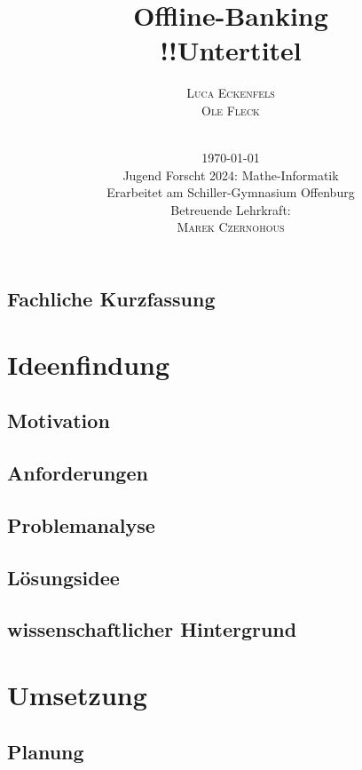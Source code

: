 \documentclass[a4paper,12pt,ngerman]{scrreport}
\title{Offline-Banking\\
    \vspace{6mm}
    \large{!!Untertitel}}
\author{\Large{\textsc{Luca Eckenfels}}\\\textsc{Ole Fleck}\\
    \vspace{5cm}\\
\date{\today\\\vspace{12mm}
Jugend Forscht 2024: Mathe-Informatik\\\vspace{6mm}
    Erarbeitet am Schiller-Gymnasium Offenburg\\
Betreuende Lehrkraft: \\\textsc{Marek Czernohous}}
}
\begin{document}


    \maketitle
    \tableofcontents
    \newpage
    \section*{Fachliche Kurzfassung}

    \chapter{Ideenfindung}\label{ch:einleitung}
    \section{Motivation}

    \section{Anforderungen}

    \section{Problemanalyse}

    \section{Lösungsidee}

    \section{wissenschaftlicher Hintergrund}


    \chapter{Umsetzung}\label{ch:umsetzung}
    \section{Planung}
\end{document}
